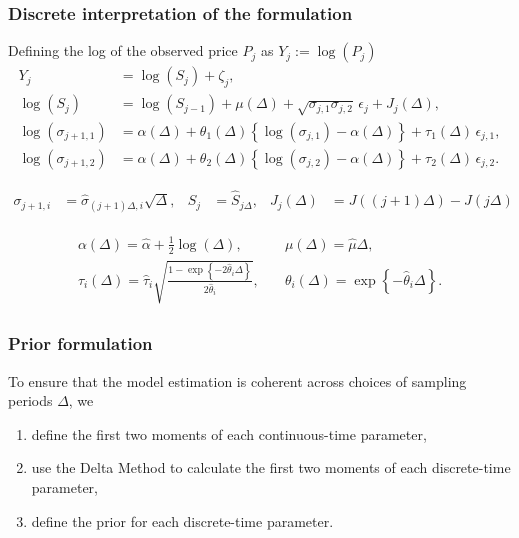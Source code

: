 \documentclass{beamer}
\newcommand{\halpha}{\hat{\alpha}}
\begin{document}
\begin{frame}
  \frametitle{Discrete interpretation of the formulation}
  Defining the log of the observed price $P_j$ as $Y_j := \log(P_j)$
  \begin{align*}
    Y_j &= \log(S_j) + \zeta_j  ,\\
    \log(S_{j}) &= \log(S_{j-1}) + \mu(\Delta) + \sqrt{\sigma_{j,1}\sigma_{j,2}} \, \epsilon_{j} + J_j(\Delta)   ,  \\
    \log(\sigma_{j+1,1}) &= \alpha(\Delta) + \theta_1(\Delta) \left\{ \log(\sigma_{j,1}) - \alpha(\Delta) \right\} + \tau_1(\Delta) \, \epsilon_{j,1}    ,  \\
    \log(\sigma_{j+1,2}) &= \alpha(\Delta) + \theta_2(\Delta) \left\{ \log(\sigma_{j,2}) - \alpha(\Delta) \right\} + \tau_2(\Delta) \, \epsilon_{j,2}.
  \end{align*}

  \begin{align*}
  \sigma_{j+1,i} &= \hat{\sigma}_{(j+1)\Delta,i}\sqrt{\Delta}, & S_j &= \hat{S}_{j\Delta}, & J_j(\Delta) &= J((j+1)\Delta) - J(j\Delta)
  \end{align*}
  
\begin{align*}
  \begin{split}
    \alpha(\Delta) = \halpha + \frac{1}{2}\log(\Delta),\quad  & 
    \mu(\Delta) = \hat{\mu} \Delta,      \\
    \tau_i(\Delta) = \hat{\tau}_i \sqrt{ \frac{1 - \exp \left\{
          -2\hat{\theta}_i \Delta \right\}}{2\hat{\theta}_i } },\quad & \theta_i(\Delta) =
    \exp\left\{
      -\hat{\theta}_i \Delta \right\}.
    \end{split}
\end{align*}
\end{frame}
\begin{frame}
  \frametitle{Prior formulation} To ensure that the model estimation
  is coherent across choices of sampling periods $\Delta$, we
  
  \begin{enumerate}
  \item define the first two moments of each continuous-time parameter,
  \item use the Delta Method to calculate the first two moments of each discrete-time parameter,
  \item define the prior for each discrete-time parameter.
  \end{enumerate}
\end{frame}
\end{document}
